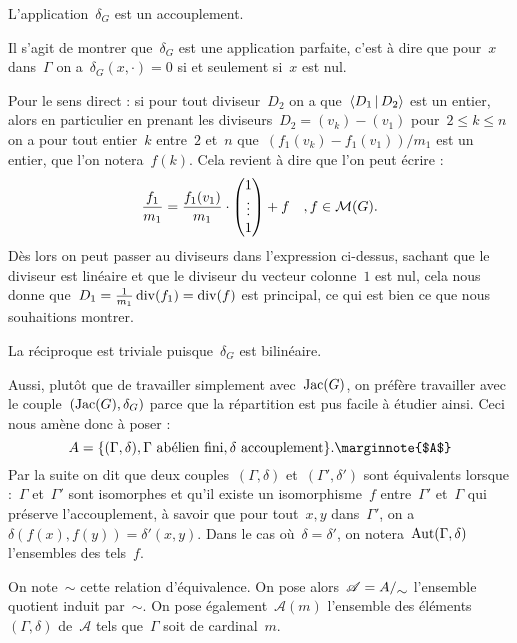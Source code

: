 	\begin{prop}
		L'application~$\delta_G$ est un accouplement.
	\end{prop}
	\begin{dem}
		Il s'agit de montrer que~$\delta_G$ est une application parfaite, c'est à dire que pour~$x$ dans~$\Gamma$ on a~$\delta_G(x,\cdot) = 0$ si et seulement si~$x$ est nul.
		
		Pour le sens direct : si pour tout diviseur~$D_2$ on a que~$\left<D_1\,|\,D_2\right>$ est un entier, alors en particulier en prenant les diviseurs~$D_2 = (v_k) - (v_1)$ pour~$2\leq k \leq n$ on a pour tout entier~$k$ entre~$2$ et~$n$ que~$(f_1(v_k)-f_1(v_1))/m_1$ est un entier, que l'on notera~$f(k)$. Cela revient à dire que l'on peut écrire :
		\[
			\frac{f_1}{m_1} = \frac{f_1(v_1)}{m_1} \cdot \begin{pmatrix} 1 \\ \vdots \\ 1 \end{pmatrix} + f \quad , f\in\mathcal{M}(G).
		\]
		Dès lors on peut passer au diviseurs dans l'expression ci-dessus, sachant que le diviseur est linéaire et que le diviseur du vecteur colonne~$1$ est nul, cela nous donne que~$D_1 = \frac{1}{m_1}\operatorname{div}(f_1) = \operatorname{div}(f)$ est principal, ce qui est bien ce que nous souhaitions montrer.
		
		La réciproque est triviale puisque~$\delta_G$ est bilinéaire.
	\end{dem}
	Aussi, plutôt que de travailler simplement avec~$\operatorname{Jac}(G)$, on préfère travailler avec le couple~$(\operatorname{Jac}(G),\delta_G)$ parce que la répartition est pus facile à étudier ainsi. Ceci nous amène donc à poser :
	\[
		A = \{(\Gamma,\delta), \Gamma\text{ abélien fini}, \delta\text{ accouplement}\}.\text{\marginnote{$A$}}
	\]
	Par la suite on dit que deux couples~$(\Gamma,\delta)$ et~$(\Gamma',\delta')$ sont équivalents lorsque :~$\Gamma$ et~$\Gamma'$ sont isomorphes et qu'il existe un isomorphisme~$f$ entre~$\Gamma'$ et~$\Gamma$ qui préserve l'accouplement, à savoir que pour tout~$x,y$ dans~$\Gamma'$, on a~$\delta(f(x),f(y)) = \delta'(x,y)$. Dans le cas où~$\delta = \delta'$, on notera~$\Aut(\Gamma,\delta)$\marginnote{$\Aut(\Gamma,\delta)$} l'ensembles des tels~$f$.
	
	On note~$\sim$ cette relation d'équivalence. On pose alors~$\mathscr{A} = \quotient{A}{\sim}$ l'ensemble quotient induit par~$\sim$. On pose également~$\mathscr{A}(m)$  l'ensemble des éléments~$(\Gamma,\delta)$ de~$\mathscr{A}$ tels que~$\Gamma$ soit de cardinal~$m$.